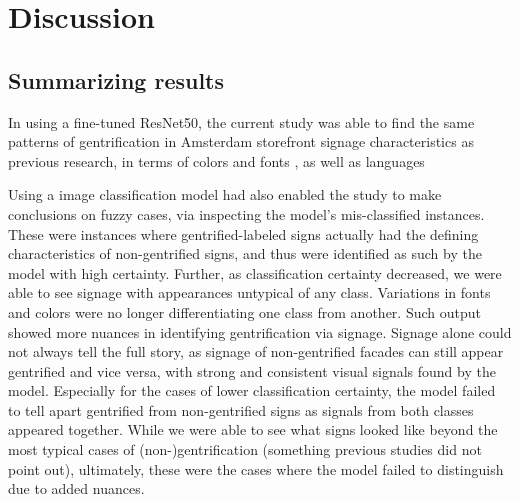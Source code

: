 \section{Discussion}
\label{sec:discussion}


\subsection{Summarizing results}

In using a fine-tuned ResNet50, the current study was able to find the same patterns of gentrification in Amsterdam storefront signage characteristics as previous research, in terms of colors and fonts \cite{rahman_signage_2020, trinch_signsays_2017, snajdr_oldschool_2018, snajdr_preserve_2022}, as well as languages \cite{kasanga_map_2012, trinch_signsays_2017}

Using a image classification model had also enabled the study to make conclusions on fuzzy cases, via inspecting the model's mis-classified instances. These were instances where gentrified-labeled signs actually had the defining characteristics of non-gentrified signs, and thus were identified as such by the model with high certainty. Further, as classification certainty decreased, we were able to see signage with appearances untypical of any class. Variations in fonts and colors were no longer differentiating one class from another. Such output showed more nuances in identifying gentrification via signage. Signage alone could not always tell the full story, as signage of non-gentrified facades can still appear gentrified and vice versa, with strong and consistent visual signals found by the model. Especially for the cases of lower classification certainty, the model failed to tell apart gentrified from non-gentrified signs as signals from both classes appeared together. While we were able to see what signs looked like  beyond the most typical cases of (non-)gentrification (something previous studies did not point out), ultimately, these were the cases where the model failed to distinguish due to added nuances.

